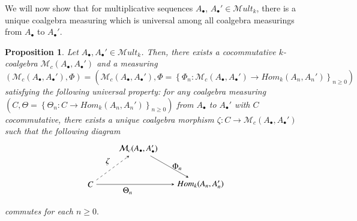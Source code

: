 \documentclass[10pt, colorlinks]{article}
\numberwithin{equation}{section} \DeclareMathSizes{2}{10}{12}{13}
\newtheorem{thm}{Proposition}[section]
\begin{document}
    We will now show that for  multiplicative sequences  $A_\bullet$, $A_\bullet' \in \mathscr{M}ult_k$, there is a unique coalgebra measuring which is universal among all coalgebra measurings from $A_\bullet$ to $A_\bullet'$.

    
    \begin{thm}\label{Prop4.1}
        Let $A_\bullet,A_\bullet' \in \mathscr{M}ult_k$. Then, there exists a cocommutative $k$-coalgebra $\mathcal M_c(A_\bullet, A_\bullet')$ and a measuring 
        \begin{equation}(\mathcal M_c(A_\bullet, A_\bullet'),\Phi)=(\mathcal M_c(A_\bullet, A_\bullet'),\Phi=\left\{\Phi_n:\mathcal M_c(A_\bullet, A_\bullet')\longrightarrow Hom_k(A_n,A_n')\right\}_{n\geq 0})
        \end{equation} satisfying the following universal property: for any coalgebra measuring $\left(C,\Theta=\left\{\Theta_n:C\longrightarrow Hom_k(A_n,A_n')\right\}_{n\geq 0}\right)$ from $A_\bullet$ to $A_\bullet'$ with $C$ cocommutative, there exists a unique coalgebra morphism $\zeta: C\longrightarrow \mathcal M_c(A_\bullet, A_\bullet')$ such that the following diagram 
         \begin{equation}\label{42digu}
         \begin{array}{c}
    \begin{tikzpicture}[>=stealth]
\node (A) at (0,0) {$C$};
\node (B) at (2.0,1.5) {$\mathcal M_c(A_\bullet,A_\bullet')$};
\node (C) at (4.6,0) {$ {Hom}_k(A_n,A_n')$};

\draw[->, dashed] (A) -- node[above left] {$\zeta$} (B);
\draw[->] (A) -- node[below left] {$\Theta_n$} (C);
\draw[->] (B) -- node[right] {$\Phi_n$} (C);
\end{tikzpicture}
\end{array}
\end{equation}
commutes for each $n\geq 0.$
    \end{thm}
\end{document}
